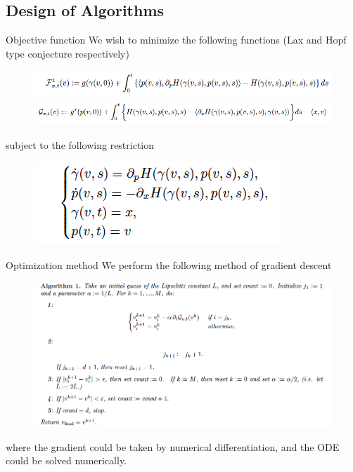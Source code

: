 \documentclass[english]{pkuslide}
\begin{document}
\subsection{Design of Algorithms}
	\begin{frame}{Objective function}
	We wish to minimize the following functions (Lax and Hopf type conjecture respectively)
	\begin{figure}
\centering
\includegraphics[height=0.1\textheight]{5.png}

\centering
\includegraphics[height=0.1\textheight]{6.png}
\end{figure}
subject to the following restriction
\begin{figure}
\centering
\includegraphics[height=0.2\textheight]{7.png}
\end{figure}
\end{frame}
\begin{frame}{Optimization method}
We perform the following method of gradient descent
\begin{figure}
\centering
\includegraphics[height=0.5\textheight]{8.png}
\end{figure}
where the gradient could be taken by numerical differentiation, and the ODE could be solved numerically.
\end{frame}
\end{document}
